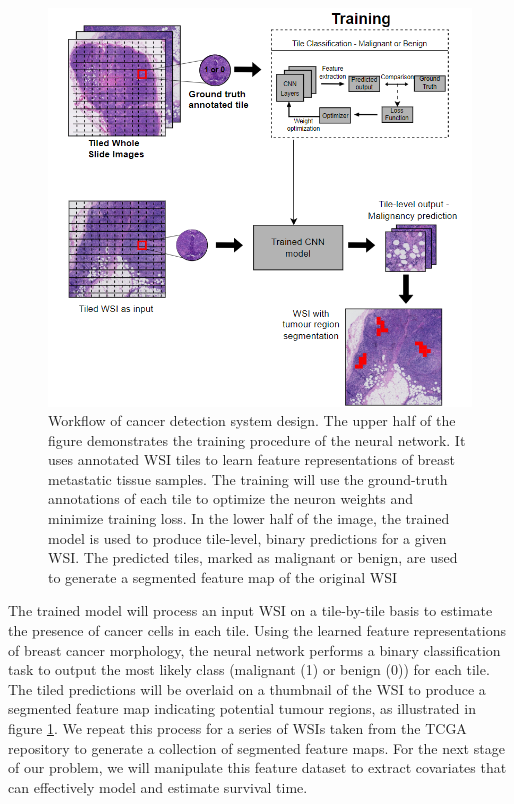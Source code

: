 \documentclass{l4proj}
\begin{document}
\begin{figure}[h]
    \centering
    \includegraphics[scale=0.7]{images/system-overview-1.png}
    \caption{Workflow of cancer detection system design. The upper half of the figure demonstrates the training procedure of the neural network. It uses annotated WSI tiles to learn feature representations of breast metastatic tissue samples. The training will use the ground-truth annotations of each tile to optimize the neuron weights and minimize training loss. In the lower half of the image, the trained model is used to produce tile-level, binary predictions for a given WSI. The predicted tiles, marked as malignant or benign, are used to generate a segmented feature map of the original WSI}
    \label{fig:sys-overview}
\end{figure}

 The trained model will process an input WSI on a tile-by-tile basis to estimate the presence of cancer cells in each tile. Using the learned feature representations of breast cancer morphology, the neural network performs a binary classification task to output the most likely class (malignant (1) or benign (0)) for each tile. The tiled predictions will be overlaid on a thumbnail of the WSI to produce a segmented feature map indicating potential tumour regions, as illustrated in figure \ref{fig:sys-overview}. We repeat this process for a series of WSIs taken from the TCGA repository to generate a collection of segmented feature maps. For the next stage of our problem, we will manipulate this feature dataset to extract covariates that can effectively model and estimate survival time. 
\end{document}
